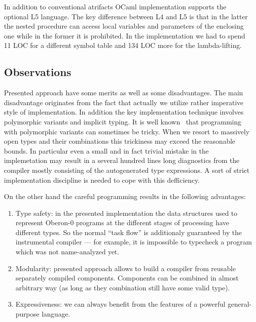 In addition to conventional atrifacts OCaml implementation supports the optional L5 language. The key difference 
between L4 and L5 is that in the latter the nested procedure can access local variables and parameters 
of the enclosing one while in the former it is prohibited. In the implementation we had to spend 11 LOC for a 
different symbol table and 134 LOC more for the lambda-lifting.

\subsection{Observations}

Presented approach have some merits as well as some disadvantages. The main disadvantage originates from
the fact that actually we utilize rather imperative style of implementation. In addition the key implementation
technique involves polymorphic variants and implicit typing. It is well known~\cite{PVReuse} that 
programming with polymorphic variants can sometimes be tricky. When we resort to massively open types and
their combinations this trickiness may exceed the reasonable bounds. In particular even a small
and in fact trivial mistake in the implemetation may result in a several hundred lines long diagnostics
from the compiler mostly consisting of the autogenerated type expressions. A sort of strict implementation
discipline is needed to cope with this defficiency.

On the other hand the careful programming results in the following advantages:

\begin{enumerate}
\item Type safety: in the presented implementation the data structures used to represent Oberon-0
programs at the different stages of processing have different types. So the normal ``task flow'' is
additionaly guaranteed by the instrumental compiler --- for example, it is impossible to typecheck a program
which was not name-analyzed yet. 
\item Modularity: presented approach allows to build a compiler from reusable separately compiled components. 
Components can be combined in almost arbitrary way (as long as they combination still have some valid type).
\item Expressiveness: we can always benefit from the features of a powerful general-purpose language.
\end{enumerate}
